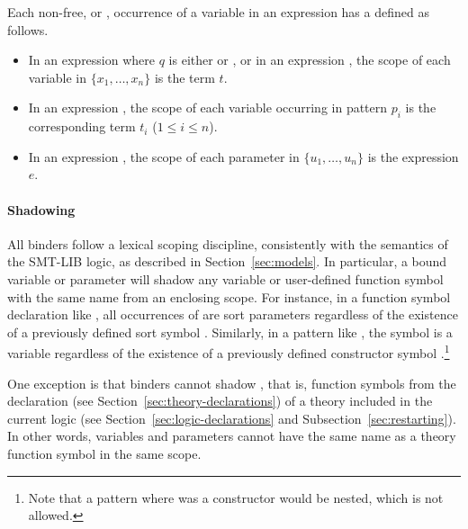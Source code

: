 \noindent 
Each non-free, or , occurrence of a variable in an expression
has a  defined as follows.

\begin{itemize}
\item
In an expression 
where $q$ is either  or , 
or in an expression ,
the scope of each variable in $\{x_1, \ldots, x_n\}$ is the term $t$.
\item
In an expression 
,
the scope of each variable occurring in pattern $p_i$ is the corresponding term $t_i$
($1\le i\le n$).
\item
In an expression 
,
the scope of each parameter in $\{u_1, \ldots, u_n\}$ is the expression $e$.
\end{itemize}

\paragraph{Shadowing}
All binders follow a lexical scoping discipline, 
consistently with the semantics of the SMT-LIB logic,
as described in Section~\ref{sec:models}.
In particular, a bound variable or parameter will shadow any variable or user-defined 
function symbol with the same name from an enclosing scope.
For instance, in a function symbol declaration like
,
all occurrences of  are sort parameters regardless of the existence
of a previously defined sort symbol .
Similarly, in a  pattern like ,
the symbol  is a variable regardless of the existence 
of a previously defined constructor symbol .\footnote{%
Note that a pattern  where  was a constructor
would be nested, which is not allowed. 
}

\begin{remark}
One exception is that binders cannot shadow ,
that is, function symbols from the declaration 
(see Section~\ref{sec:theory-declarations})
of a theory included in the current logic
(see Section~\ref{sec:logic-declarations} and Subsection~\ref{sec:restarting}).
In other words, variables and parameters cannot have the same name 
as a theory function symbol in the same scope.
\end{remark}


